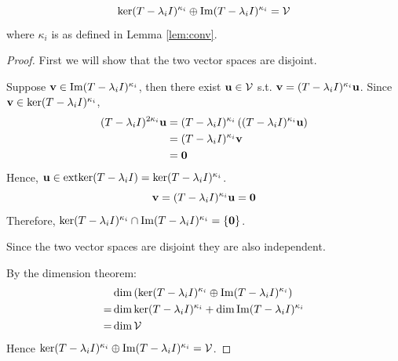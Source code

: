 \begin{lemma}\label{lem:decom}
    \label{lem:img_sum_ker}
    \begin{equation*}
        \ker(T-\lambda_iI)^{\kappa_i}\oplus\operatorname{Im}(T-\lambda_iI)^{\kappa_i}=\mathcal{V}
    \end{equation*}
    where \(\kappa_i\) is as defined in Lemma \ref{lem:conv}.
\end{lemma}
\begin{proof}
    First we will show that the two vector spaces are disjoint.

    Suppose $\mathbf{v} \in \operatorname{Im}(T-\lambda_iI)^{\kappa_i}$, then there exist $\mathbf{u}\in\mathcal{V}$ s.t. $\mathbf{v}=(T-\lambda_iI)^{\kappa_i}\mathbf{u}$.
    Since $\mathbf{v}\in\ker(T-\lambda_iI)^{\kappa_i}$,
    \begin{align*}
        (T-\lambda_iI)^{2\kappa_i}\mathbf{u}
        &=(T-\lambda_iI)^{\kappa_i}\left((T-\lambda_iI)^{\kappa_i}\mathbf{u}\right)\\
        &=(T-\lambda_iI)^{\kappa_i}\mathbf{v}\\
        &=\mathbf{0}
    \end{align*}
    Hence, $\mathbf{u}\in\operatorname{extker}(T-\lambda_iI)=\ker(T-\lambda_iI)^{\kappa_i}$.
    \begin{equation*}
        \mathbf{v} = (T-\lambda_iI)^{\kappa_i}\mathbf{u} = \mathbf{0}
    \end{equation*}
    Therefore, $\ker(T-\lambda_iI)^{\kappa_i}\cap\operatorname{Im}(T-\lambda_iI)^{\kappa_i}=\{\mathbf{0}\}$.

    Since the two vector spaces are disjoint they are also independent.
    
    By the dimension theorem:
    \begin{align*}
        &\dim\left(\ker(T-\lambda_iI)^{\kappa_i}\oplus\operatorname{Im}(T-\lambda_iI)^{\kappa_i}\right)\\
        =&\dim\ker(T-\lambda_iI)^{\kappa_i} + \dim\operatorname{Im}(T-\lambda_iI)^{\kappa_i}\\
        =&\dim\mathcal{V}\\
    \end{align*}
    Hence $\ker(T-\lambda_iI)^{\kappa_i}\oplus\operatorname{Im}(T-\lambda_iI)^{\kappa_i}=\mathcal{V}$.
\end{proof}



